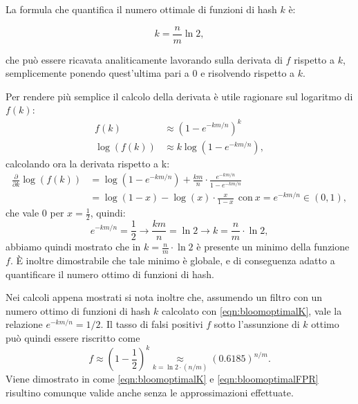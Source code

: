 \documentclass[../../main.tex]{subfiles}
\begin{document}
La formula che quantifica il numero ottimale di funzioni di hash $k$ è:

\begin{equation}
    k = \frac{n}{m}\ln{2} ,
    \label{eqn:bloomoptimalK}
\end{equation}

che può essere ricavata analiticamente lavorando sulla derivata di $f$ rispetto a $k$, semplicemente ponendo quest'ultima pari a 0 e risolvendo rispetto a $k$.

Per rendere più semplice il calcolo della derivata è utile ragionare sul logaritmo di $f(k)$:
\begin{align*}
    f(k) & \approx \left(1 - e^{-km/n}\right)^k\\
    \log(f(k)) & \approx k \log\left(1 - e^{-km/n}\right),
\end{align*}
calcolando ora la derivata rispetto a k:
\begin{align*}
    \frac{\partial}{\partial k} \log(f(k)) & = \log(1 - e^{-km/n}) + \frac{km}{n} \cdot \frac{e^{-km/n}}{1 - e^{-km/n}}\\
    &= \log(1 - x) - \log(x) \cdot \frac{x}{1 - x} \ \ \text{con} \ x = e^{-km/n} \in (0,1),
\end{align*}
che vale 0 per $ x = \frac{1}{2}$, quindi: 
\[e^{-km/n} = \frac{1}{2} \rightarrow \frac{km}{n} = \ln2 \rightarrow k = \frac{n}{m}\cdot \ln2 ,\]
abbiamo quindi mostrato che in $k = \frac{n}{m}\cdot \ln2$ è presente un minimo della funzione $f$. È inoltre dimostrabile che tale minimo è globale, e di conseguenza adatto a quantificare il numero ottimo di funzioni di hash.

Nei calcoli appena mostrati si nota inoltre che, assumendo un filtro con un numero ottimo di funzioni di hash $k$ calcolato con \eqref{eqn:bloomoptimalK}, vale la relazione $e^{-km/n} = 1/2$. Il tasso di falsi positivi $f$ sotto l'assunzione di $k$ ottimo può quindi essere riscritto come
\begin{equation}
f \approx \left(1 - \frac{1}{2}\right)^k \underset{k = \ln{2} \cdot \left(n/m\right)}{\approx} (0.6185)^{n/m}.
\label{eqn:bloomoptimalFPR}
\end{equation}
Viene dimostrato in \cite{Broder2005} come \eqref{eqn:bloomoptimalK} e \eqref{eqn:bloomoptimalFPR} risultino comunque valide anche senza le approssimazioni effettuate.
\end{document}
